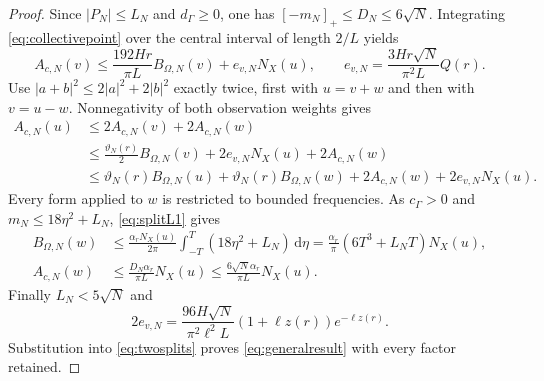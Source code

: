 \documentclass[11pt]{article}
\theoremstyle{remark}\newtheorem{remark}[theorem]{Remark}
\newcommand{\dd}{\,\mathrm d}
\newcommand{\NX}{N_X}
\numberwithin{equation}{section}
\begin{document}
\begin{proof}
Since $|P_N|\le L_N$ and $d_\Gamma\ge0$, one has $[-m_N]_+\le D_N\le6\sqrt N$. Integrating \eqref{eq:collectivepoint} over the central interval of length $2/L$ yields
\begin{equation}\label{eq:centralv}
 A_{c,N}(v)\le\frac{192Hr}{\pi L}B_{\Omega,N}(v)
                  +e_{v,N}\NX(u),\qquad
 e_{v,N}=\frac{3Hr\sqrt N}{\pi^2 L}Q(r).
\end{equation}
Use $|a+b|^2\le2|a|^2+2|b|^2$ exactly twice, first with $u=v+w$ and then with $v=u-w$. Nonnegativity of both observation weights gives
\begin{align}
 A_{c,N}(u)
 &\le2A_{c,N}(v)+2A_{c,N}(w)\nonumber\\
 &\le\frac{\vartheta_N(r)}2B_{\Omega,N}(v)
           +2e_{v,N}\NX(u)+2A_{c,N}(w)\nonumber\\
 &\le\vartheta_N(r)B_{\Omega,N}(u)
       +\vartheta_N(r)B_{\Omega,N}(w)
       +2A_{c,N}(w)+2e_{v,N}\NX(u).\label{eq:twosplits}
\end{align}
Every form applied to $w$ is restricted to bounded frequencies. As $c_\Gamma>0$ and $m_N\le18\eta^2+L_N$, \eqref{eq:splitL1} gives
\begin{align}
 B_{\Omega,N}(w)
 &\le\frac{\alpha_r\NX(u)}{2\pi}
             \int_{-T}^T(18\eta^2+L_N)\dd\eta
 =\frac{\alpha_r}{\pi}(6T^3+L_NT)\NX(u),\label{eq:farpositive}\\
 A_{c,N}(w)&\le\frac{D_N\alpha_r}{\pi L}\NX(u)
       \le\frac{6\sqrt N\alpha_r}{\pi L}\NX(u).\label{eq:farnegative}
\end{align}
Finally $L_N<5\sqrt N$ and
\[
 2e_{v,N}=\frac{96H\sqrt N}{\pi^2\ell^2L}
                  (1+\ell z(r))e^{-\ell z(r)}.
\]
Substitution into \eqref{eq:twosplits} proves \eqref{eq:generalresult} with every factor retained.
\end{proof}
\end{document}
